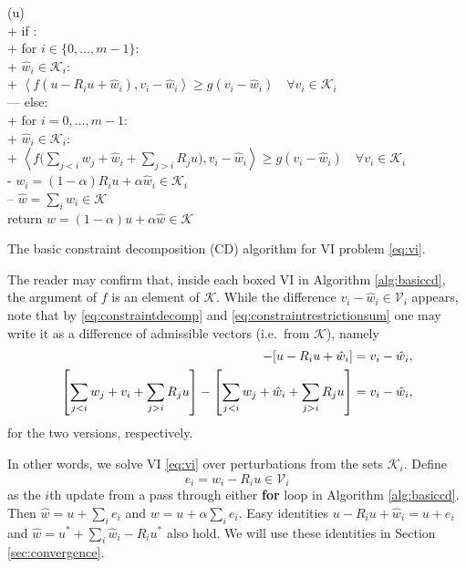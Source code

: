 \documentclass[letterpaper,final,12pt,reqno]{amsart}
\theoremstyle{cstyle}
\theoremstyle{cstyle*}
\theoremstyle{dstyle}
\numberwithin{equation}{section}
\numberwithin{figure}{section}
\numberwithin{table}{section}
\numberwithin{theorem}{section}
\newcommand{\cK}{\mathcal{K}}
\newcommand{\cV}{\mathcal{V}}
\newcommand{\ip}[2]{\left<#1,#2\right>}
\begin{document}
\begin{pseudofloat}[H]
\begin{pseudo*}
(u\in\cK)\text{:} \\+
    if : \\+
        for $i \in \{0,\dots,m-1\}$: \\+
            $\hat w_i\in \cK_i$: \\+
                 $\boxed{\ip{f(u - R_i u + \hat w_i)}{v_i-\hat w_i} \ge g(v_i-\hat w_i)} \quad \forall v_i\in \cK_i$ \\---
    else: \\+
        for $i = 0,\dots,m-1$: \\+
            $\hat w_i\in \cK_i$: \\+
                $\displaystyle \boxed{\ip{f\Big(\sum_{j<i} w_j + \hat w_i + \sum_{j>i} R_j u\Big)}{v_i-\hat w_i} \ge g(v_i-\hat w_i)} \quad \forall v_i\in \cK_i$ \\-
            $w_i = (1-\alpha) R_i u + \alpha \hat w_i\in\cK_i$ \\--
    $\hat w = \sum_i \hat w_i\in\cK$ \\
    return $w=(1-\alpha) u + \alpha \hat w\in\cK$
\end{pseudo*}
\caption{The basic constraint decomposition (CD) algorithm for VI problem \eqref{eq:vi}.}
\label{alg:basiccd}
\end{pseudofloat}

The reader may confirm that, inside each boxed VI in Algorithm \ref{alg:basiccd}, the argument of $f$ is an element of $\cK$.  While the difference $v_i - \hat w_i \in \cV_i$ appears, note that by \eqref{eq:constraintdecomp} and \eqref{eq:constraintrestrictionsum} one may write it as a difference of admissible vectors (i.e.~from $\cK$), namely
\begin{align*}
[u - R_i u + v_i] - [u - R_i u + \hat w_i] &= v_i - \hat w_i, \label{eq:admissibledifference} \\
\left[\sum_{j<i} w_j + v_i + \sum_{j>i} R_j u\right] - \left[\sum_{j<i} w_j + \hat w_i + \sum_{j>i} R_j u\right] &= v_i - \hat w_i,  \notag
\end{align*}
for the two versions, respectively.

In other words, we solve VI \eqref{eq:vi} over perturbations from the sets $\cK_i$.  Define
\begin{equation}
e_i = \hat w_i - R_i u \in \cV_i \label{eq:ithupdate}
\end{equation}
as the $i$th update from a pass through either \textbf{for} loop in Algorithm \ref{alg:basiccd}.  Then $\hat w = u + \sum_{i} e_i$ and $w = u + \alpha \sum_i e_i$.  Easy identities $u - R_i u + \hat w_i = u + e_i$ and $\hat w = u^* + \sum_i \hat w_i - R_i u^*$ also hold.  We will use these identities in Section \ref{sec:convergence}.
\end{document}
